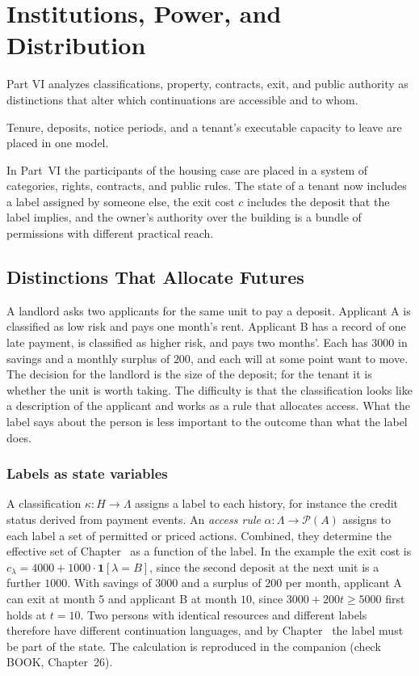 \part{Institutions, Power, and Distribution}
\label{part:VI}

Part VI analyzes classifications, property, contracts, exit, and public authority as distinctions that alter which continuations are accessible and to whom.

\begin{housing}Tenure, deposits, notice periods, and a tenant's executable capacity to leave are placed in one model.\end{housing}


In Part~VI the participants of the housing case are placed in a system of categories, rights, contracts, and public rules. The state of a tenant now includes a label assigned by someone else, the exit cost $c$ includes the deposit that the label implies, and the owner's authority over the building is a bundle of permissions with different practical reach.

\chapter{Distinctions That Allocate Futures}\label{ch:26}

A landlord asks two applicants for the same unit to pay a deposit. Applicant A is classified as low risk and pays one month's rent. Applicant B has a record of one late payment, is classified as higher risk, and pays two months'. Each has $3000$ in savings and a monthly surplus of $200$, and each will at some point want to move. The decision for the landlord is the size of the deposit; for the tenant it is whether the unit is worth taking. The difficulty is that the classification looks like a description of the applicant and works as a rule that allocates access. What the label says about the person is less important to the outcome than what the label does.

\section{Labels as state variables}

A classification $\kappa:H\to\Lambda$ assigns a label to each history, for instance the credit status derived from payment events. An \emph{access rule} $\alpha:\Lambda\to\mathcal P(A)$ assigns to each label a set of permitted or priced actions. Combined, they determine the effective set of Chapter~ as a function of the label. In the example the exit cost is $c_\lambda=4000+1000\cdot\mathbf 1[\lambda=B]$, since the second deposit at the next unit is a further $1000$. With savings of $3000$ and a surplus of $200$ per month, applicant A can exit at month $5$ and applicant B at month $10$, since $3000+200t\ge 5000$ first holds at $t=10$. Two persons with identical resources and different labels therefore have different continuation languages, and by Chapter~ the label must be part of the state. The calculation is reproduced in the companion (check BOOK, Chapter~26).

